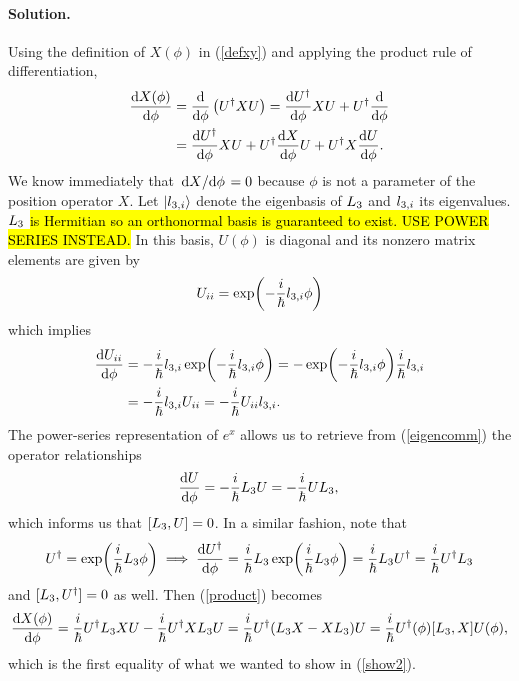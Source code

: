 \documentclass[10pt]{article}
\newcommand{\refeq}[1]{(\ref{#1})}
\newenvironment{solution}
{
    \paragraph{Solution.}
    \ignorespaces
}
{
    \bigskip
}
\begin{document}
\begin{solution}
	Using the definition of $X(\phi)$ in \refeq{defxy} and applying the product rule of differentiation,
	\begin{align}
		\dv{X(\phi)}{\phi} &= \dv{}{\phi} \left( U^\dagger X U \right) = \dv{U^\dagger}{\phi} X U + U^\dagger \dv{}{\phi} (X U) \\
		&= \dv{U^\dagger}{\phi} X U + U^\dagger \dv{X}{\phi} U + U^\dagger X \dv{U}{\phi}. \label{product}
	\end{align}
	We know immediately that $\dv*{X}{\phi} = 0$ because $\phi$ is not a parameter of the position operator $X$.  Let $\ket{l_{3,i}}$ denote the eigenbasis of $L_3$ and $l_{3,i}$ its eigenvalues.  $L_3$ \hl{is Hermitian so an orthonormal basis is guaranteed to exist.  USE POWER SERIES INSTEAD.}  In this basis, $U(\phi)$ is diagonal and its nonzero matrix elements are given by
	\begin{equation} \label{diag}
		U_{ii} = \exp(-\frac{i}{\hbar} l_{3,i} \phi)
	\end{equation}
	which implies
	\begin{align}
		\dv{U_{ii}}{\phi} &= -\frac{i}{\hbar} l_{3,i} \exp(-\frac{i}{\hbar} l_{3,i} \phi) = -\exp(-\frac{i}{\hbar} l_{3,i} \phi) \frac{i}{\hbar} l_{3,i} \\
		&= -\frac{i}{\hbar} l_{3,i} U_{ii} = -\frac{i}{\hbar} U_{ii} l_{3,i}. \label{eigencomm}
	\end{align}
	The power-series representation of $e^{x}$ allows us to retrieve from \refeq{eigencomm} the operator relationships
	\begin{equation} \label{oper}
		\dv{U}{\phi} = -\frac{i}{\hbar} L_3 U = -\frac{i}{\hbar} U L_3, \\
	\end{equation}
	which informs us that $[L_3, U] = 0$.  In a similar fashion, note that
	\begin{equation}
		U^\dagger = \exp(\frac{i}{\hbar} L_3 \phi) \implies \dv{U^\dagger}{\phi} = \frac{i}{\hbar} L_3 \exp(\frac{i}{\hbar} L_3 \phi) = \frac{i}{\hbar} L_3 U^\dagger = \frac{i}{\hbar} U^\dagger L_3
	\end{equation}
	and $[L_3, U^\dagger] = 0$ as well.  Then \refeq{product} becomes
	\begin{equation}
		\dv{X(\phi)}{\phi} = \frac{i}{\hbar} U^\dagger L_3 X U - \frac{i}{\hbar} U^\dagger X L_3 U = \frac{i}{\hbar} U^\dagger (L_3 X - X L_3) U = \frac{i}{\hbar} U^\dagger(\phi) [L_3, X] U(\phi), \label{middle}
	\end{equation}
	which is the first equality of what we wanted to show in \refeq{show2}.
	

\end{solution}
\end{document}
